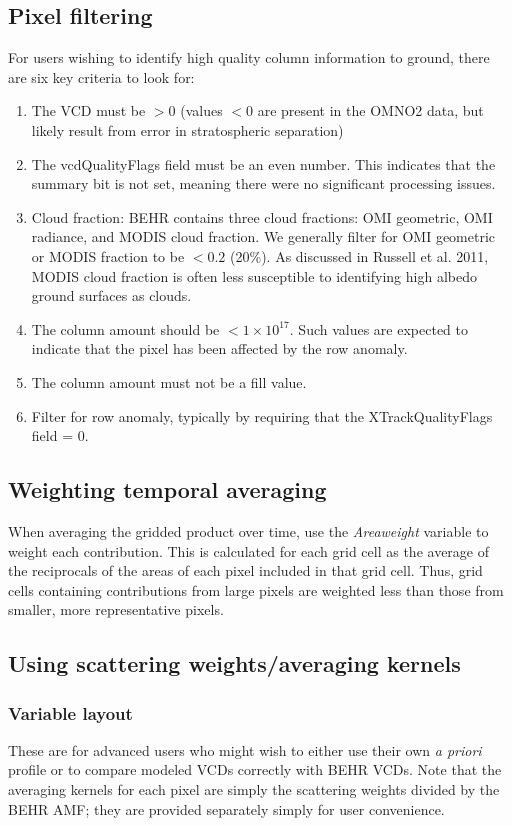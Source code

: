 \documentclass[12pt]{article}
\begin{document}
	\subsection{Pixel filtering}
	For users wishing to identify high quality  column information to ground, there are six key criteria to look for:
	\begin{enumerate}
		\item The VCD must be $> 0$ (values $< 0$ are present in the OMNO2 data, but likely result from error in stratospheric separation)
        \item The vcdQualityFlags field must be an even number. This indicates that
the summary bit is not set, meaning there were no significant processing issues.
        \item Cloud fraction: BEHR contains three cloud fractions: OMI geometric,
OMI radiance, and MODIS cloud fraction. We generally filter for OMI geometric or MODIS fraction to be $< 0.2$ (20\%).  As discussed in Russell et al. 2011, MODIS cloud fraction is often less susceptible to identifying high albedo ground surfaces as clouds.
        \item The column amount should be $< 1 \times 10^{17}$. Such values are expected to
indicate that the pixel has been affected by the row anomaly.
        \item The column amount must not be a fill value.
        \item Filter for row anomaly, typically by requiring that the 
XTrackQualityFlags field = 0.
	\end{enumerate}
	
	\subsection{Weighting temporal averaging}
	When averaging the gridded product over time, use the \emph{Areaweight} variable to weight each contribution.  This is calculated for each grid cell as the average of the reciprocals of the areas of each pixel included in that grid cell.  Thus, grid cells containing contributions from large pixels are weighted less than those from smaller, more representative pixels.
	
	\subsection{Using scattering weights/averaging kernels} \label{sec:scweights}
	\subsubsection{Variable layout}
	These are for advanced users who might wish to either use their own \emph{a priori}  profile or to compare modeled  VCDs correctly with BEHR VCDs.  Note that the averaging kernels for each pixel are simply the scattering weights divided by the BEHR AMF; they are provided separately simply for user convenience.
	
\end{document}
